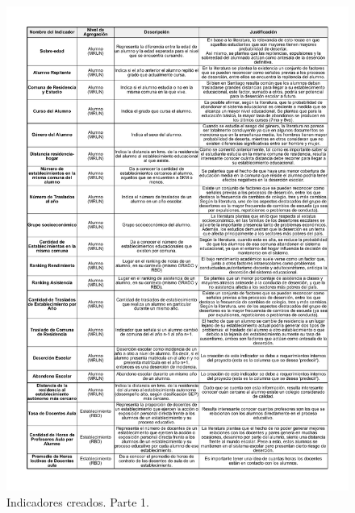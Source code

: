 \begin{figure}[H]
  \centering
    \includegraphics[width=1\textwidth]{Figuras/Indicadores1}
      \caption{Indicadores creados. Parte 1.}
    \label{fig:indicadores1}
\end{figure}

